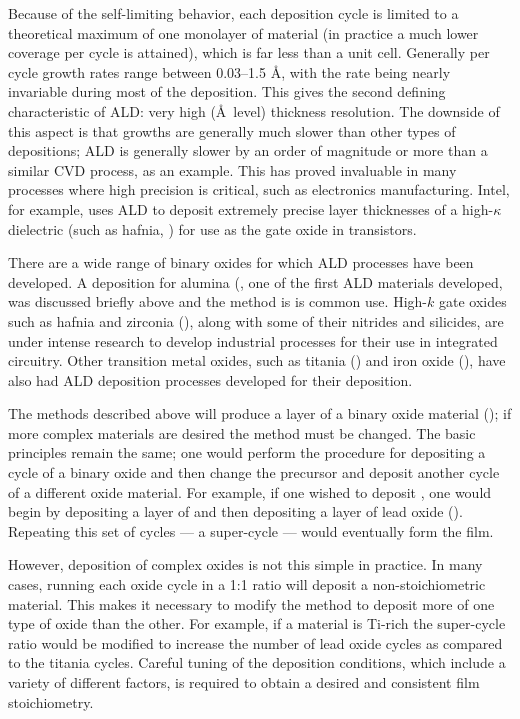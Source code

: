 Because of the self-limiting behavior, each deposition cycle is limited to a theoretical maximum of one monolayer of material (in practice a much lower coverage per cycle is attained), which is far less than a unit cell.\cite{ALD-Handbook} Generally per cycle growth rates range between 0.03--1.5 \AA{}, with the rate being nearly invariable during most of the deposition. This gives the second defining characteristic of ALD: very high (\AA\ level) thickness resolution. The downside of this aspect is that growths are generally much slower than other types of depositions; ALD is generally slower by an order of magnitude or more than a similar CVD process, as an example. This has proved invaluable in many processes where high precision is critical, such as electronics manufacturing. Intel, for example, uses ALD to deposit extremely precise layer thicknesses of a high-$\kappa$ dielectric (such as hafnia, ) for use as the gate oxide in transistors.\cite{toriumi_application_2008,chen_atomic_2007}

There are a wide range of binary oxides for which ALD processes have been developed. A deposition for alumina (, one of the first ALD materials developed, was discussed briefly above and the method is is common use.\cite{lee_al2o3_2003,puurunen_surface_2005} High-$k$ gate oxides such as hafnia and zirconia (), along with some of their nitrides and silicides, are under intense research to develop industrial processes for their use in integrated circuitry.\cite{toriumi_application_2008,chen_atomic_2007} Other transition metal oxides, such as titania () and iron oxide (), have also had ALD deposition processes developed for their deposition. \cite{lim_atomic_2003,scheffe_atomic_2009}

The methods described above will produce a layer of a binary oxide material (); if more complex materials are desired the method must be changed. The basic principles remain the same; one would perform the procedure for depositing a cycle of a binary oxide and then change the precursor and deposit another cycle of a different oxide material. For example, if one wished to deposit \PTO{}, one would begin by depositing a layer of  and then depositing a layer of lead oxide (). Repeating this set of cycles --- a super-cycle --- would eventually form the \PTO{} film. 

However, deposition of complex oxides is not this simple in practice. In many cases, running each oxide cycle in a 1:1 ratio will deposit a non-stoichiometric material. This makes it necessary to modify the method to deposit more of one type of oxide than the other. For example, if a material is Ti-rich the super-cycle ratio would be modified to increase the number of lead oxide cycles as compared to the titania cycles. Careful tuning of the deposition conditions, which include a variety of different factors, is required to obtain a desired and consistent film stoichiometry. 

